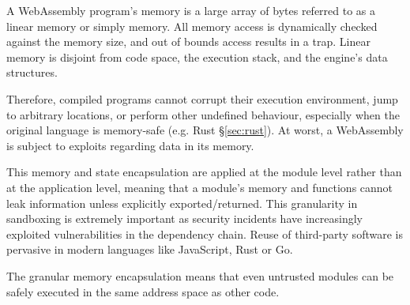 A WebAssembly program's memory is a large array of bytes referred to as a linear memory or simply memory. All memory access is dynamically checked against the memory size, and out of bounds access results in a trap. Linear memory is disjoint from code space, the execution stack, and the engine's data structures. 


Therefore, compiled programs cannot corrupt their execution environment, jump to arbitrary locations, or perform other undefined behaviour, especially when the original language is memory-safe (e.g. Rust §\ref{sec:rust}). At worst, a WebAssembly is subject to exploits regarding data in its memory.

This memory and state encapsulation are applied at the module level rather than at the application level, meaning that a module's memory and functions cannot leak information unless explicitly exported/returned. This granularity in sandboxing is extremely important as security incidents have increasingly exploited vulnerabilities in the dependency chain. Reuse of third-party software is pervasive in modern languages like JavaScript, Rust or Go.

The granular memory encapsulation means that even untrusted modules can be safely executed in the same address space as other code.



